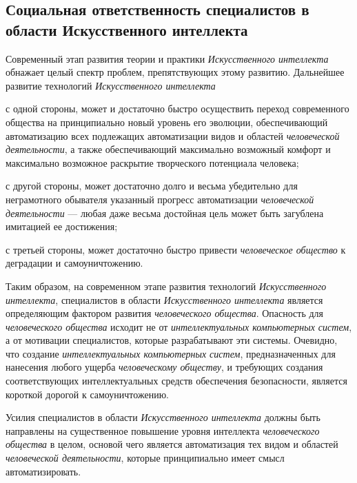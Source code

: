 \subsection*{Социальная ответственность специалистов в области Искусственного интеллекта}
Современный этап развития теории и практики \textit{Искусственного интеллекта} обнажает целый спектр проблем, препятствующих этому развитию. Дальнейшее развитие технологий \textit{Искусственного интеллекта}
\begin{textitemize}
	\item с одной стороны, может и достаточно быстро осуществить переход современного общества на принципиально новый уровень его эволюции, обеспечивающий  автоматизацию всех подлежащих автоматизации видов и областей \textit{человеческой деятельности}, а также обеспечивающий максимально возможный комфорт и максимально возможное раскрытие творческого потенциала  человека;
	\item с другой стороны, может достаточно долго и весьма убедительно для неграмотного обывателя  указанный прогресс автоматизации \textit{человеческой деятельности} --- любая даже весьма достойная цель может быть загублена имитацией ее достижения;
	\item с третьей стороны, может достаточно быстро привести \textit{человеческое общество} к деградации и самоуничтожению.
\end{textitemize}

Таким образом, на современном этапе развития технологий \textit{Искусственного интеллекта},   специалистов в области \textit{Искусственного интеллекта} является определяющим фактором развития \textit{человеческого общества}. Опасность для \textit{человеческого общества} исходит не от \textit{интеллектуальных компьютерных систем}, а от мотивации специалистов, которые разрабатывают эти системы. Очевидно, что создание \textit{интеллектуальных компьютерных систем}, предназначенных для  нанесения любого ущерба \textit{человеческому обществу}, и требующих создания соответствующих интеллектуальных средств обеспечения безопасности, является короткой дорогой к самоуничтожению.

Усилия специалистов в области \textit{Искусственного интеллекта} должны быть направлены на существенное повышение уровня интеллекта \textit{человеческого общества} в целом, основой чего является  автоматизация  тех видом и областей \textit{человеческой деятельности}, которые принципиально имеет смысл автоматизировать.

